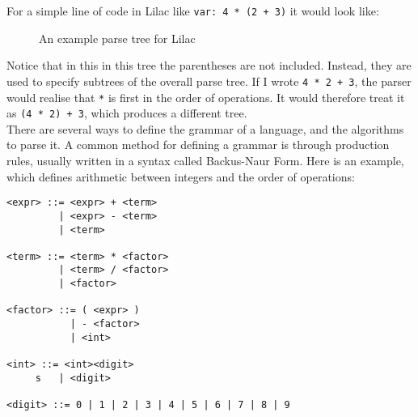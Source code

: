 \documentclass[a4paper, 12pt]{article}
\begin{document}
For a simple line of code in Lilac like \verb|var: 4 * (2 + 3)| it would look like:\\

\begin{figure}[ht]
\centering
{}
\caption{An example parse tree for Lilac}
\end{figure}

Notice that in this in this tree the parentheses are not included. Instead, they are used to specify subtrees of the overall parse tree. If I wrote \verb|4 * 2 + 3|, the parser would realise that \verb|*| is first in the order of operations. It would therefore treat it as \verb|(4 * 2) + 3|, which produces a different tree.
\\
There are several ways to define the grammar of a language, and the algorithms to parse it. A common method for defining a grammar is through production rules, usually written in a syntax called Backus-Naur Form. Here is an example, which defines arithmetic between integers and the order of operations:
\begin{verbatim}
<expr> ::= <expr> + <term>
         | <expr> - <term>
         | <term>

<term> ::= <term> * <factor>
         | <term> / <factor>
         | <factor>

<factor> ::= ( <expr> )
           | - <factor>
           | <int>

<int> ::= <int><digit>
     s   | <digit>

<digit> ::= 0 | 1 | 2 | 3 | 4 | 5 | 6 | 7 | 8 | 9
\end{verbatim}
\end{document}
